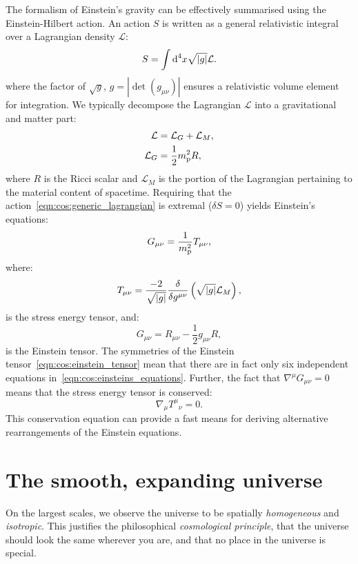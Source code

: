 The formalism of Einstein's gravity can be effectively summarised using the Einstein-Hilbert action. An action $S$ is written as a general relativistic integral over a Lagrangian density $\mathcal{L}$:
\begin{equation}
  S = \int\d[4]{x} \sqrt{|g|} \mathcal{L}.
  \label{eqn:cos:generic_lagrangian}
\end{equation}
where the factor of $\sqrt{g}$, $g=\left|\det\left( g_{\mu\nu} \right)\right|$ ensures a relativistic volume element for integration.
We typically decompose the Lagrangian $\mathcal{L}$ into a gravitational and matter part:
\begin{align}
  \mathcal{L} &= \mathcal{L}_G + \mathcal{L}_M,
  \label{eqn:cos:decomp}\\
  \mathcal{L}_G &= \frac{1}{2} \m^2 R,
  \label{eqn:cos:L_grav}
\end{align}
where $R$ is the Ricci scalar and $\mathcal{L}_M$ is the portion of the Lagrangian pertaining to the material content of spacetime. Requiring that the action~\eqref{eqn:cos:generic_lagrangian} is extremal ($\delta S = 0$) yields Einstein's equations:
\begin{equation}
  G_{\mu\nu} = \frac{1}{\m^2}T_{\mu\nu},
  \label{eqn:cos:einsteins_equations}
\end{equation}
where:
\begin{equation}
  T_{\mu\nu} = \frac{-2}{\sqrt{\abs{g}}}\frac{\delta}{\delta g^{\mu\nu}}\left( \sqrt{\abs{g}} \mathcal{L}_M \right),
  \label{eqn:cos:SET_fundamantal}
\end{equation}
is the stress energy tensor, and:
\begin{equation}
  G_{\mu\nu} = R_{\mu\nu} - \frac{1}{2}g_{\mu\nu} R,
  \label{eqn:cos:einstein_tensor}
\end{equation}
is the Einstein tensor. The symmetries of the Einstein tensor~\eqref{eqn:cos:einstein_tensor} mean that there are in fact only six independent equations in~\eqref{eqn:cos:einsteins_equations}. Further, the fact that $\nabla^\mu G_{\mu\nu}=0$ means that the stress energy tensor is conserved:
\begin{equation}
  \nabla_\mu {T^{\mu}}_{\nu} = 0.
  \label{eqn:cos:SET_conservation}
\end{equation}
This conservation equation can provide a fast means for deriving alternative rearrangements of the Einstein equations.

\section{The smooth, expanding universe}
On the largest scales, we observe the universe to be spatially {\em homogeneous\/} and {\em isotropic}. This justifies the philosophical {\em cosmological principle}, that the universe should look the same wherever you are, and that no place in the universe is special. 

